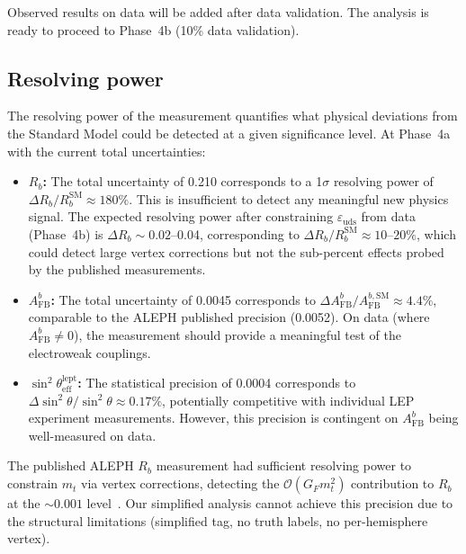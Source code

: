 \documentclass[11pt,a4paper]{article}
\begin{document}
Observed results on data will be added after data validation. The analysis is ready
to proceed to Phase~4b (10\% data validation).

\subsection{Resolving power}
\label{sec:resolving_power}

The resolving power of the measurement quantifies what physical deviations from the
Standard Model could be detected at a given significance level. At Phase~4a with the
current total uncertainties:

\begin{itemize}
\item \textbf{$R_b$:} The total uncertainty of 0.210 corresponds to a 1$\sigma$ resolving
power of $\Delta R_b / R_b^\mathrm{SM} \approx 180\%$. This is insufficient to detect
any meaningful new physics signal. The expected resolving power after constraining
$\varepsilon_\mathrm{uds}$ from data (Phase~4b) is $\Delta R_b \sim 0.02$--0.04,
corresponding to $\Delta R_b / R_b^\mathrm{SM} \approx 10$--$20\%$, which could detect
large vertex corrections but not the sub-percent effects probed by the published
measurements.

\item \textbf{$A_\mathrm{FB}^b$:} The total uncertainty of 0.0045 corresponds to
$\Delta A_\mathrm{FB}^b / A_\mathrm{FB}^{b,\mathrm{SM}} \approx 4.4\%$, comparable
to the ALEPH published precision (0.0052). On data (where $A_\mathrm{FB}^b \neq 0$),
the measurement should provide a meaningful test of the electroweak couplings.

\item \textbf{$\sin^2\theta_\mathrm{eff}^\mathrm{lept}$:} The statistical precision
of 0.0004 corresponds to $\Delta \sin^2\theta / \sin^2\theta \approx 0.17\%$,
potentially competitive with individual LEP experiment measurements. However, this
precision is contingent on $A_\mathrm{FB}^b$ being well-measured on data.
\end{itemize}

The published ALEPH $R_b$ measurement had sufficient resolving power to constrain
$m_t$ via vertex corrections, detecting the $\mathcal{O}(G_F m_t^2)$ contribution
to $R_b$ at the $\sim 0.001$ level~\cite{ALEPH:Rb:1996}. Our simplified analysis
cannot achieve this precision due to the structural limitations (simplified tag,
no truth labels, no per-hemisphere vertex).
\end{document}
